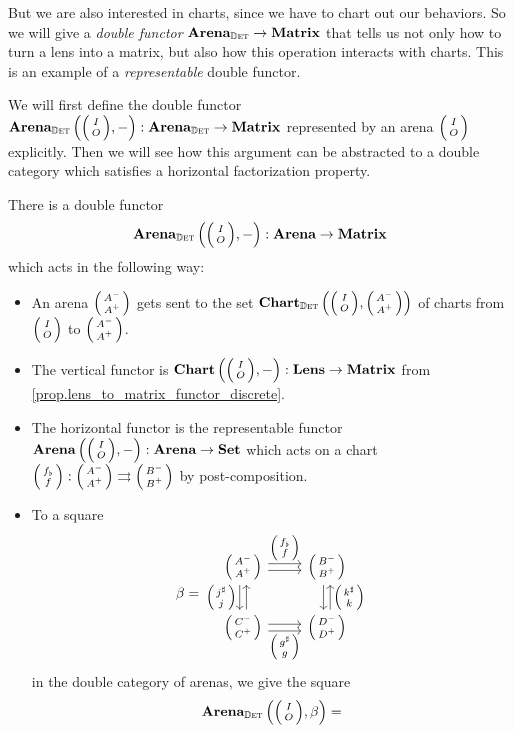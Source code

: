 \documentclass[DynamicalBook]{subfiles}
\begin{document}
 But we are also interested in charts, since we have to chart out our
behaviors. So we will give a \emph{double functor} $\textbf{Arena}_{\mathbb{D}\textsc{et}} \to
\textbf{Matrix}$ that tells us not only how to turn a lens into a matrix, but also
how this operation interacts with charts. This is an example of a
\emph{representable} double functor.


We will first define the double functor $\Cat{Arena}_{\determ}\left( \lens{I}{O}, -
\right) : \Cat{Arena}_{\determ} \to \Cat{Matrix}$ represented by an arena $\lens{I}{O}$
explicitly. Then we will see how this argument can be abstracted to a double
category which satisfies a horizontal factorization property.

\begin{proposition}\label{prop.representable_double_functor}
  There is a double functor
  $$\Cat{Arena}_{\determ}\left( \littlelens{I}{O}, -
\right) : \Cat{Arena} \to \Cat{Matrix}$$
which acts in the following way:
\begin{itemize}
  \item An arena $\lens{A^-}{A^+}$ gets sent to the set $\Cat{Chart}_{\determ}\left(
      \lens{I}{O}, \lens{A^-}{A^+} \right)$ of charts from $\lens{I}{O}$ to $\lens{A^-}{A^+}$.
  \item The vertical functor is $\Cat{Chart}\left( \lens{I}{O}, - \right) :
    \Cat{Lens} \to \Cat{Matrix}$ from \cref{prop.lens_to_matrix_functor_discrete}.
  \item The horizontal functor is the representable functor $\Cat{Arena}\left(
      \lens{I}{O}, - \right) : \Cat{Arena} \to \smset$ which acts on a chart
    $\lens{f_{\flat}}{f} : \lens{A^-}{A^+} \tto \lens{B^-}{B^+}$ by
    post-composition.
  \item To a square
    \[ \beta = 
      \begin{tikzcd}
        \littlelens{A^-}{A^+} \ar[r, shift left, "\littlelens{f_{\flat}}{f}"] \ar[r, shift
        right] \ar[d, shift right, "\littlelens{j^{\sharp}}{j}"'] \ar[d, shift left,
        leftarrow] & \littlelens{B^-}{B^+} \ar[d, shift left, leftarrow,
        "\littlelens{k^{\sharp}}{k}"] \ar[d, shift right]\\
        \littlelens{C^-}{C^+} \ar[r, shift right, "\littlelens{g^{\sharp}}{g}"'] \ar[r,
        shift left] & \littlelens{D^-}{D^+}
      \end{tikzcd}
    \]
    in the double category of arenas, we give the square
        \[\Cat{Arena}_{\determ}\left(\littlelens{I}{O}, \beta \right)  =\]
        \[
      \begin{tikzcd}[sep = large]

\end{tikzcd}\]
\end{itemize}
\end{proposition}
\end{document}
